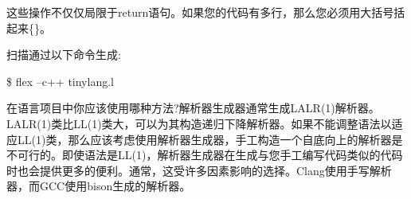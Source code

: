 这些操作不仅仅局限于return语句。如果您的代码有多行，那么您必须用大括号括起来\{\}。\par

扫描通过以下命令生成:\par

\begin{tcolorbox}[colback=white,colframe=black]
\$ flex –c++ tinylang.l
\end{tcolorbox}

在语言项目中你应该使用哪种方法?解析器生成器通常生成LALR(1)解析器。LALR(1)类比LL(1)类大，可以为其构造递归下降解析器。如果不能调整语法以适应LL(1)类，那么应该考虑使用解析器生成器，手工构造一个自底向上的解析器是不可行的。即使语法是LL(1)，解析器生成器在生成与您手工编写代码类似的代码时也会提供更多的便利。通常，这受许多因素影响的选择。Clang使用手写解析器，而GCC使用bison生成的解析器。\par




















